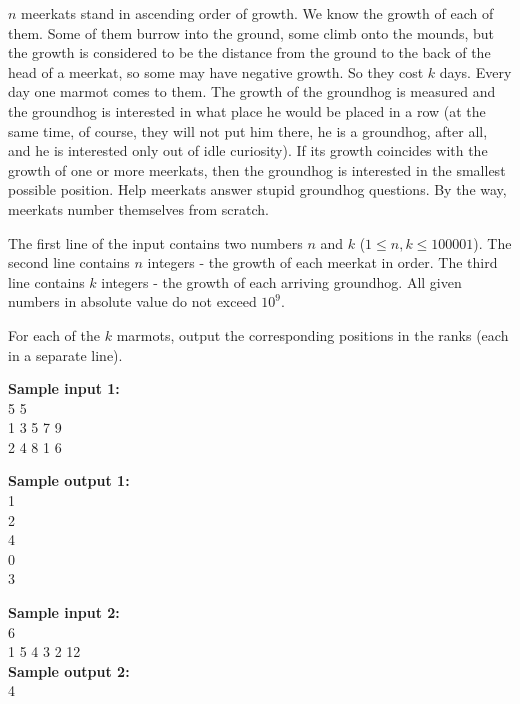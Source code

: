 \documentclass[a4paper]{article}
\begin{document}
$n$ meerkats stand in ascending order of growth. We know the growth of each of them. Some of them burrow into the ground, some climb onto the mounds, but the growth is considered to be the distance from the ground to the back of the head of a meerkat, so some may have negative growth. So they cost $k$ days. Every day one marmot comes to them. The growth of the groundhog is measured and the groundhog is interested in what place he would be placed in a row (at the same time, of course, they will not put him there, he is a groundhog, after all, and he is interested only out of idle curiosity). If its growth coincides with the growth of one or more meerkats, then the groundhog is interested in the smallest possible position. Help meerkats answer stupid groundhog questions. By the way, meerkats number themselves from scratch.

The first line of the input contains two numbers $n$ and $k$ ($1 \le n, k \le 100001$). The second line contains $n$ integers - the growth of each meerkat in order. The third line contains $k$ integers - the growth of each arriving groundhog. All given numbers in absolute value do not exceed $10^9$.

For each of the $k$ marmots, output the corresponding positions in the ranks (each in a separate line).
\LINE

\noindent \textbf{Sample input 1:}\\
5 5\\
1 3 5 7 9\\
2 4 8 1 6

\noindent \textbf{Sample output 1:}\\
1\\
2\\
4\\
0\\
3

\SPACE

\noindent \textbf{Sample input 2:}\\
6\\
1 5 4 3 2 12\\

\noindent \textbf{Sample output 2:}\\
4
\end{document}
